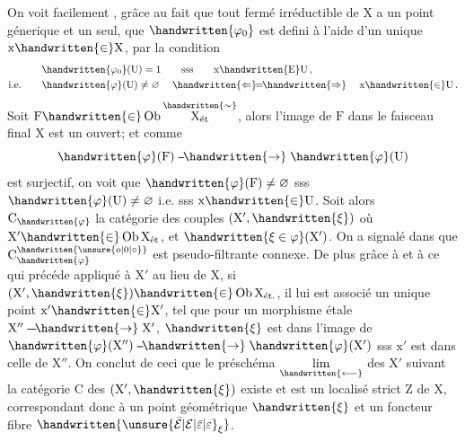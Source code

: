\begin{lrbox}{\coteFourTypescript}
\begin{minipage}[t]{.96\linewidth}
On voit facilement , grâce au fait que tout fermé irréductible de $\mathrm X$ a un point génerique et un seul, que $\handwritten{\varphi_{0}}$ est defini à l'aide d'un  unique $\mathrm x\handwritten{\in}\mathrm X$, par la condition
\[
\begin{aligned}
&\handwritten{\varphi_{0}}(\mathrm U)=1\qquad\text{sss}\qquad \mathrm x\handwritten{\mathrm E}\mathrm U\,,\\
\text{i.e.}\qquad &\handwritten{\varphi}(\mathrm U)\ne\varnothing\quad \mathrel{\handwritten{\Leftarrow}\mkern-7mu=\mkern-7mu\handwritten{\Rightarrow}}\quad \mathrm x\handwritten{\in}\mathrm U\,.
\end{aligned}
\]
Soit $\mathrm F\handwritten{\in}\operatorname{Ob}\overset{\handwritten{\sim}}{\mathrm X_{\text{ét}}}$, alors l'image de $\mathrm F$ dans le faisceau final $\mathrm X$ est un ouvert; et comme
\[
\handwritten{\varphi}(\mathrm F)\mathrel{\mbox{-}\mkern-2mu\mbox{-}\mkern-3mu\handwritten{\to}}\handwritten{\varphi}(\mathrm U)
\]
est surjectif, on voit que $\handwritten{\varphi}(\mathrm F)\ne\varnothing$ sss $\handwritten{\varphi}(\mathrm U)\ne\varnothing$ i.e. sss $\mathrm x\handwritten{\in}\mathrm U$. Soit alors $\mathrm C_{\handwritten{\varphi}}$ la catégorie des couples $(\mathrm X',\handwritten{\xi})$ où $\mathrm X'\handwritten{\in}\operatorname{Ob}\mathrm X_{\text{ét}}$, et $\handwritten{\xi\in\varphi}(\mathrm X')$. On a signalé dans  que $\mathrm C_{\handwritten{\varphi}}^{\handwritten{\unsure{o|0|\circ}}}$ est pseudo-filtrante connexe. De plus grâce à  et à ce qui précéde appliqué à $\mathrm X'$ au lieu de $\mathrm X$, si $(\mathrm X',\handwritten{\xi})\handwritten{\in}\operatorname{Ob}\mathrm X_{\text{ét.}}$, il lui est\unsure{:} associé un unique point $\mathrm x'\handwritten{\in}\mathrm X'$, tel que pour un morphisme étale $\mathrm X''\mathrel{\mbox{-}\mkern-2mu\mbox{-}\mkern-2mu\mbox{-}\mkern-3mu\handwritten{\to}}\mathrm X'$, $\handwritten{\xi}$ est dans l'image de $\handwritten{\varphi}(\mathrm X'')\mathrel{\mbox{-}\mkern-2mu\mbox{-}\mkern-3mu\handwritten{\to}}\handwritten{\varphi}(\mathrm X')$ sss $\mathrm x'$ est dans celle de $\mathrm X''$. On conclut de ceci que le préschéma $\underset{\handwritten{\longleftarrow}}{\lim}$ des $\mathrm X'$ suivant la catégorie $\mathrm C$ des $(\mathrm X',\handwritten{\xi})$ existe et est un localisé strict $\mathrm Z$ de $\mathrm X$, correspondant donc à un point géométrique $\handwritten{\xi}$ et un foncteur fibre $\handwritten{{\unsure{\bar{\mathcal E}|\mathcal E|\bar{\varepsilon}|\varepsilon}}_{\xi}}$.
\end{minipage}
\end{lrbox}
\noindent{}
